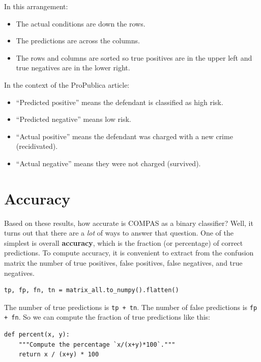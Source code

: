 In this arrangement:

\begin{itemize}
\item
  The actual conditions are down the rows.
\item
  The predictions are across the columns.
\item
  The rows and columns are sorted so true positives are in the upper
  left and true negatives are in the lower right.
\end{itemize}

In the context of the ProPublica article:

\begin{itemize}
\item
  ``Predicted positive'' means the defendant is classified as high risk.
\item
  ``Predicted negative'' means low risk.
\item
  ``Actual positive'' means the defendant was charged with a new crime
  (recidivated).
\item
  ``Actual negative'' means they were not charged (survived).
\end{itemize}

\hypertarget{accuracy}{%
\section{Accuracy}\label{accuracy}}

Based on these results, how accurate is COMPAS as a binary classifier?
Well, it turns out that there are a \emph{lot} of ways to answer that
question. One of the simplest is overall \textbf{accuracy}, which is the
fraction (or percentage) of correct predictions. To compute accuracy, it
is convenient to extract from the confusion matrix the number of true
positives, false positives, false negatives, and true negatives.

\begin{lstlisting}[]
tp, fp, fn, tn = matrix_all.to_numpy().flatten()
\end{lstlisting}

The number of true predictions is \passthrough{\lstinline!tp + tn!}. The
number of false predictions is \passthrough{\lstinline!fp + fn!}. So we
can compute the fraction of true predictions like this:

\begin{lstlisting}[]
def percent(x, y):
    """Compute the percentage `x/(x+y)*100`."""
    return x / (x+y) * 100
\end{lstlisting}

